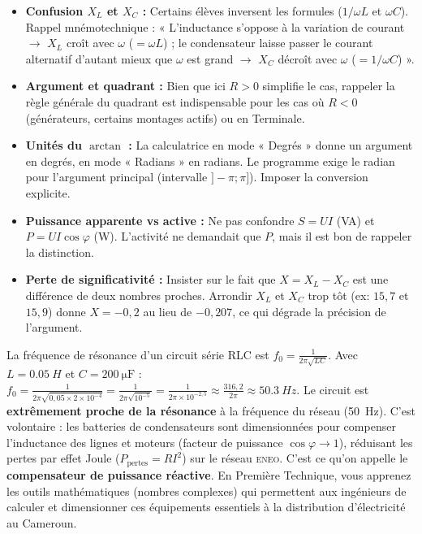 \documentclass[11pt]{article}
\begin{document}
\begin{attention}
\begin{itemize}
    \item \textbf{Confusion $X_L$ et $X_C$ :} Certains élèves inversent les formules ($1/\omega L$ et $\omega C$). Rappel mnémotechnique : « L'inductance s'oppose à la variation de courant $\to$ $X_L$ croît avec $\omega$ ($=\omega L$) ; le condensateur laisse passer le courant alternatif d'autant mieux que $\omega$ est grand $\to$ $X_C$ décroît avec $\omega$ ($=1/\omega C$) ».
    \item \textbf{Argument et quadrant :} Bien que ici $R>0$ simplifie le cas, rappeler la règle générale du quadrant est indispensable pour les cas où $R<0$ (générateurs, certains montages actifs) ou en Terminale.
    \item \textbf{Unités du $\arctan$ :} La calculatrice en mode « Degrés » donne un argument en degrés, en mode « Radians » en radians. Le programme exige le radian pour l'argument principal (intervalle $]-\pi;\pi]$). Imposer la conversion explicite.
    \item \textbf{Puissance apparente vs active :} Ne pas confondre $S = UI$ (VA) et $P = UI\cos\varphi$ (W). L'activité ne demandait que $P$, mais il est bon de rappeler la distinction.
    \item \textbf{Perte de significativité :} Insister sur le fait que $X = X_L - X_C$ est une différence de deux nombres proches. Arrondir $X_L$ et $X_C$ trop tôt (ex: $15,7$ et $15,9$) donne $X = -0,2$ au lieu de $-0,207$, ce qui dégrade la précision de l'argument.
\end{itemize}
\end{attention}

\begin{savaistu}
La fréquence de résonance d'un circuit série RLC est $f_0 = \frac{1}{2\pi\sqrt{LC}}$.
Avec $L=\SI{0,05}{H}$ et $C=\SI{200}{\micro\farad}$ :
$f_0 = \frac{1}{2\pi\sqrt{0,05 \times 2 \times 10^{-4}}} = \frac{1}{2\pi\sqrt{10^{-5}}} = \frac{1}{2\pi \times 10^{-2,5}} \approx \frac{316,2}{2\pi} \approx \SI{50,3}{Hz}$.
Le circuit est \textbf{extrêmement proche de la résonance} à la fréquence du réseau (\SI{50}{Hz}). C'est volontaire : les batteries de condensateurs sont dimensionnées pour compenser l'inductance des lignes et moteurs (facteur de puissance $\cos\varphi \to 1$), réduisant les pertes par effet Joule ($P_{\text{pertes}} = R I^2$) sur le réseau \textsc{eneo}. C'est ce qu'on appelle le \textbf{compensateur de puissance réactive}. En Première Technique, vous apprenez les outils mathématiques (nombres complexes) qui permettent aux ingénieurs de calculer et dimensionner ces équipements essentiels à la distribution d'électricité au Cameroun.
\end{savaistu}
\end{document}
